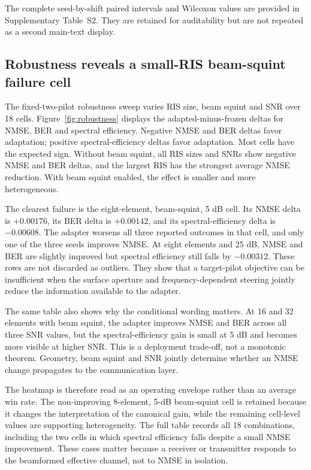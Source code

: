 \documentclass[10pt,twocolumn]{article}
\begin{document}

The complete seed-by-shift paired intervals and Wilcoxon values are provided in Supplementary Table~S2. They are retained for auditability but are not repeated as a second main-text display.

\subsection{Robustness reveals a small-RIS beam-squint failure cell}

The fixed-two-pilot robustness sweep varies RIS size, beam squint and SNR over 18 cells. Figure~\ref{fig:robustness} displays the adapted-minus-frozen deltas for NMSE, BER and spectral efficiency. Negative NMSE and BER deltas favor adaptation; positive spectral-efficiency deltas favor adaptation. Most cells have the expected sign. Without beam squint, all RIS sizes and SNRs show negative NMSE and BER deltas, and the largest RIS has the strongest average NMSE reduction. With beam squint enabled, the effect is smaller and more heterogeneous.

The clearest failure is the eight-element, beam-squint, 5 dB cell. Its NMSE delta is $+0.00176$, its BER delta is $+0.00142$, and its spectral-efficiency delta is $-0.00608$. The adapter worsens all three reported outcomes in that cell, and only one of the three seeds improves NMSE. At eight elements and 25 dB, NMSE and BER are slightly improved but spectral efficiency still falls by $-0.00312$. These rows are not discarded as outliers. They show that a target-pilot objective can be insufficient when the surface aperture and frequency-dependent steering jointly reduce the information available to the adapter.

The same table also shows why the conditional wording matters. At 16 and 32 elements with beam squint, the adapter improves NMSE and BER across all three SNR values, but the spectral-efficiency gain is small at 5 dB and becomes more visible at higher SNR. This is a deployment trade-off, not a monotonic theorem. Geometry, beam squint and SNR jointly determine whether an NMSE change propagates to the communication layer.

The heatmap is therefore read as an operating envelope rather than an average win rate. The non-improving 8-element, 5-dB beam-squint cell is retained because it changes the interpretation of the canonical gain, while the remaining cell-level values are supporting heterogeneity. The full table records all 18 combinations, including the two cells in which spectral efficiency falls despite a small NMSE improvement. These cases matter because a receiver or transmitter responds to the beamformed effective channel, not to NMSE in isolation.
\end{document}
